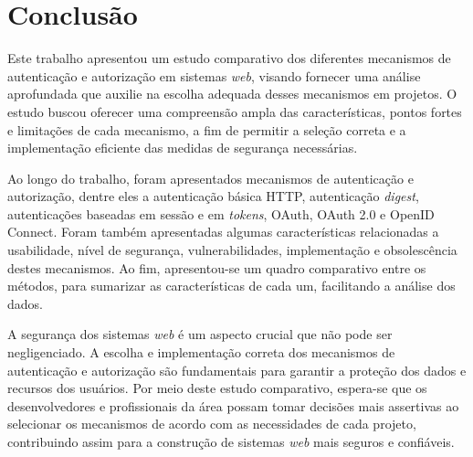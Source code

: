 \section{Conclusão}

Este trabalho apresentou um estudo comparativo dos diferentes mecanismos de 
autenticação e autorização em sistemas \emph{web}, visando fornecer uma análise aprofundada que auxilie na 
escolha adequada desses mecanismos em projetos. O estudo buscou oferecer uma compreensão ampla das 
características, pontos fortes e limitações de cada mecanismo, a fim de permitir a seleção correta 
e a implementação eficiente das medidas de segurança necessárias.

Ao longo do trabalho, foram apresentados mecanismos de autenticação e autorização, dentre eles a
autenticação básica HTTP, autenticação \emph{digest}, autenticações baseadas em sessão e em 
\emph{tokens}, OAuth, OAuth 2.0 e OpenID Connect. Foram também apresentadas algumas 
características relacionadas a usabilidade, nível de segurança, vulnerabilidades, implementação e 
obsolescência destes mecanismos. Ao fim, apresentou-se um quadro comparativo entre os métodos, para
sumarizar as características de cada um, facilitando a análise dos dados. 

A segurança dos sistemas \emph{web} é um aspecto crucial que não pode ser negligenciado. A escolha e 
implementação correta dos mecanismos de autenticação e autorização são fundamentais para garantir 
a proteção dos dados e recursos dos usuários. Por meio deste estudo comparativo, espera-se que os 
desenvolvedores e profissionais da área possam tomar decisões mais assertivas ao selecionar os 
mecanismos de acordo com as necessidades de cada projeto, contribuindo assim para a 
construção de sistemas \emph{web} mais seguros e confiáveis.